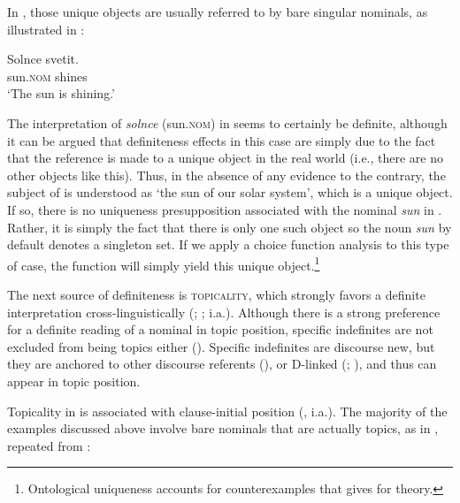 \documentclass[output=paper,
colorlinks,
citecolor=brown,
newtxmath
]{langscibook}
\begin{document}
In , those unique objects are usually referred to by bare singular nominals, as illustrated in :

\ea \label{ex:seres:31}
\gll	Solnce		svetit.\\
		sun.\textsc{nom}		shines\\
\glt `The sun is shining.'
\z


\noindent The interpretation of \textit{solnce} (sun.\textsc{nom}) in  seems to certainly be definite, although it can be argued that definiteness effects in this case are simply due to the fact that the reference is made to a unique object in the real world (i.e., there are no other objects like this). Thus, in the absence of any evidence to the contrary, the subject of  is understood as `the sun of our solar system', which is a unique object. If so, there is no uniqueness presupposition associated with the nominal \textit{sun} in . Rather, it is simply the fact that there is only one such object so the noun \textit{sun} by default denotes a singleton set. If we apply a choice function analysis to this type of case, the function will simply yield this unique object.\footnote{Ontological uniqueness accounts for counterexamples that \citet{Dayal2017} gives for  theory.}

The next source of definiteness is \textsc{topicality}, which strongly favors a definite interpretation cross-linguistically (\citealt{Reinhart1981}; \citealt{Erteschik-Shir2007}; i.a.). Although there is a strong preference for a definite reading of a nominal in topic position, specific indefinites are not excluded from being topics either (\citealt{Reinhart1981}). Specific indefinites are discourse new, but they are anchored to other discourse referents (\citealt{Heusinger2002}), or D-linked (\citealt{Pesetsky1987}; \citealt{Dyakonova2009}), and thus can appear in topic position.


Topicality in  is associated with clause-initial position (\citealt{Geist2010, Jasinskaja2016}, i.a.). The majority of the examples discussed above involve bare nominals that are actually topics, as in , repeated from :
\end{document}
